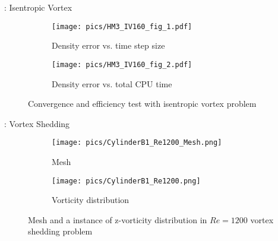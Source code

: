 \documentclass[aspectratio=169,serif]{beamer} %
\begin{document}
\begin{frame}{\secname: Isentropic Vortex}
  \scriptsize
  \begin{figure}[htbp]
    \centering
    \begin{subfigure}{0.5\textwidth}
        \texttt{[image: pics/HM3\_IV160\_fig\_1.pdf]}
        \caption[]{Density error vs. time step size }
        \label{sfig:IVTests_Conv}
    \end{subfigure}\hfill
    \begin{subfigure}{0.5\textwidth}
        \texttt{[image: pics/HM3\_IV160\_fig\_2.pdf]}
        \caption[]{Density error vs. total CPU time}
        \label{sfig:IVTests_Eff}
    \end{subfigure}
    \caption[]{Convergence and efficiency test with isentropic vortex problem}
    \label{fig:IVTests}
  \end{figure}
\end{frame}


\begin{frame}{\secname: Vortex Shedding}
  \scriptsize
  \begin{figure}[htbp]
    \centering
    \begin{subfigure}{0.4\textwidth}
        \texttt{[image: pics/CylinderB1\_Re1200\_Mesh.png]}
        \caption[]{Mesh}
        \label{sfig:CylinderRe1200Demo_Mesh}
    \end{subfigure}
    \begin{subfigure}{0.4\textwidth}
        \texttt{[image: pics/CylinderB1\_Re1200.png]}
        \caption[]{Vorticity distribution}
        \label{sfig:CylinderRe1200Demo_Vort}
    \end{subfigure}
    \caption[]{Mesh and a instance of z-vorticity distribution
        in $Re=1200$ vortex shedding problem}
    \label{fig:CylinderRe1200Demo}
  \end{figure}
\end{frame}
\end{document}

